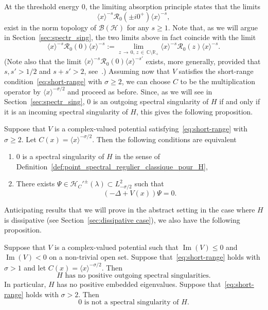 \documentclass[10pt]{amsart}
\theoremstyle{definition}\newtheorem{defi}[theo]{Definition}\newtheorem{rema}[theo]{Remark}\newtheorem{exam}[theo]{Example}\newtheorem{exem}[theo]{Example}\newtheorem{nota}[theo]{Notation}
\newcommand{\Hi}{\mathcal{H}}
\newcommand{\bbC}{\mathbb{C}}
\newcommand{\R}{\mathbb{R}}
\newcommand{\Res}{\mathcal{R}}
\newcommand{\clB}{\mathcal{B}}
\DeclareMathOperator{\im}{Im}
\newcommand*{\romanenumi}{\renewcommand*{\theenumi}{\roman{enumi}}}
\begin{document}
At the threshold energy $0$, the limiting absorption principle states that the limits
\begin{equation*}
\langle x\rangle^{-s}\Res_0\left(\pm i0^+\right)\langle x\rangle^{-s},
\end{equation*}
exist in the norm topology of $\clB(\Hi)$ for any $s\ge 1$. Note that, as we will argue in Section~\ref{sec:spectr_sing}, the two limits above in fact coincide with the limit
\begin{equation*}
\langle x\rangle^{-s}\Res_0(0)\langle x\rangle^{-s} := \lim_{z\,\to\,0,\,z\,\in\,\bbC\setminus\R_+}\langle x\rangle^{-s}\Res_0(z)\langle x\rangle^{-s}.
\end{equation*}
(Note also that the limit $\langle x\rangle^{-s}\Res_0(0)\langle x\rangle^{-s'}$ exists, more generally, provided that $s,s'>1/2$ and $s+s'>2$, see~\cite{JeKa79_01}.) Assuming now that $V$ satisfies the short-range condition~\eqref{eq:short-range} with $\sigma\geq 2$, we can choose $C$ to be the multiplication operator by $\langle x\rangle^{-\sigma/2}$ and proceed as before. Since, as we will see in Section~\ref{sec:spectr_sing}, $0$ is an outgoing spectral singularity of $H$ if and only if it is an incoming spectral singularity of $H$, this gives the following proposition.

\begin{prop}
Suppose that $V$ is a complex-valued potential satisfying~\eqref{eq:short-range} with $\sigma\geq 2$. Let $C(x)=\langle x\rangle^{-\sigma/2}$. Then the following conditions are equivalent
\begin{enumerate}\romanenumi
\item\label{it:spec_sing_schr-zero}
$0$ is a spectral singularity of $H$ in the sense of Definition~\ref{def:point_spectral_regulier_classique_pour_H},
\item\label{it:res_state_schr-zero}
There exists $\Psi\in\Hi_C'^\pm(\lambda) \subset L^2_{-\sigma/2}$ such that
\begin{equation*}
(-\Delta+V(x))\Psi=0.
\end{equation*}
\end{enumerate}
\end{prop}

Anticipating results that we will prove in the abstract setting in the case where $H$ is dissipative (see Section~\ref{sec:dissipative case}), we also have the following proposition.

\begin{prop}\label{prop:schr_diss}
Suppose that $V$ is a complex-valued potential such that $\im(V)\le0$ and $\im(V)<0$ on a non-trivial open set. Suppose that~\eqref{eq:short-range} holds with $\sigma>1$ and let $C(x)=\langle x\rangle^{-\sigma/2}$. Then
\begin{equation*}
H \text{ has no positive outgoing spectral singularities}.
\end{equation*}
In particular, $H$ has no positive embedded eigenvalues. Suppose that~\eqref{eq:short-range} holds with $\sigma>2$. Then
\begin{equation*}
0 \text{ is not a spectral singularity of }H.
\end{equation*}
\end{prop}
\end{document}
